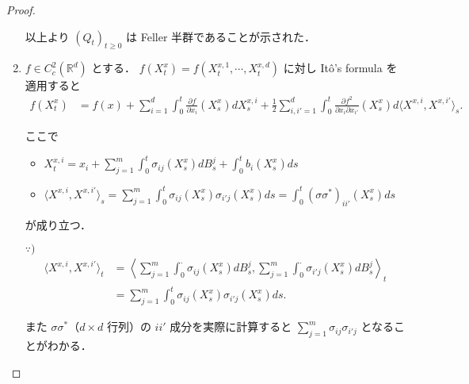 \documentclass{jsarticle}
\begin{document}
\begin{proof}
\begin{enumerate}[label=(\arabic*)]
        以上より $(Q_{t})_{t\ge0}$ は Feller 半群であることが示された．
        
        \item
        $f\in C_{c}^2(\mathbb{R}^d)$ とする．
        $f(X_{t}^{x})=f(X_{t}^{x, 1},\dotsb, X_{t}^{x, d})$ に対し It\^{o}'s formula を適用すると
        \begin{align}
            f(X_{t}^{x})
            &= f(x)
            + \sum_{i=1}^{d}\int_{0}^{t}\frac{\partial f}{\partial x_{i}}(X_{s}^{x})dX_{s}^{x, i}
            + \frac{1}{2}\sum_{i, i'=1}^{d}\int_{0}^{t}\frac{\partial f^2}{\partial x_{i}\partial x_{i'}}(X_{s}^{x})d\langle X^{x, i}, X^{x, i'}\rangle_{s}.
        \end{align}

        ここで
        \begin{itemize}
            \item 
            $\displaystyle X_{t}^{x, i}
            = x_i
            + \sum_{j=1}^{m}\int_{0}^{t}\sigma_{ij}(X_{s}^{x})dB_{s}^{j}
            + \int_{0}^{t}b_{i}(X_{s}^{x})ds$
            \item 
            $\displaystyle \langle X^{x, i}, X^{x, i'}\rangle_{s}
            = \sum_{j=1}^{m}\int_0^t\sigma_{ij}(X_{s}^{x})\sigma_{i'j}(X_{s}^{x})ds
            = \int_0^t(\sigma\sigma^{\ast})_{ii'}(X_{s}^{x})ds$
        \end{itemize}
        が成り立つ．

        \begin{screen}
            $\because)$
            \begin{align}
                \langle X^{x, i}, X^{x, i'}\rangle_{t}
                &= \left\langle \sum_{j=1}^{m}\int_{0}^{\cdot}\sigma_{ij}(X_{s}^{x})dB_{s}^{j},
                \sum_{j=1}^{m}\int_{0}^{\cdot}\sigma_{i'j}(X_{s}^{x})dB_{s}^{j}\right\rangle_{t} \\
                &= \sum_{j=1}^{m}\int_{0}^{t}\sigma_{ij}(X_{s}^{x})\sigma_{i'j}(X_{s}^{x})ds.
            \end{align}

            また $\sigma\sigma^{\ast}$（$d\times d$ 行列）の $ii'$ 成分を実際に計算すると $\sum_{j=1}^{m}\sigma_{ij}\sigma_{i'j}$ となることがわかる．
        \end{screen}
        

\end{enumerate}
\end{proof}
\end{document}
